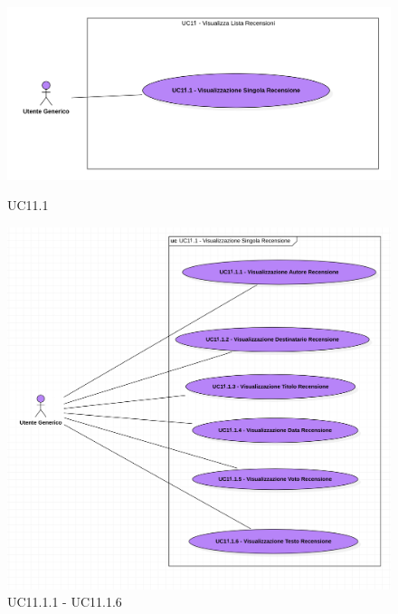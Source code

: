             \begin{figure}[H]
                \centering
                \includegraphics[scale=0.6]{src/img/UC11.1.png}
                \caption{UC11.1}
                \includegraphics[scale=0.4]{src/img/UC11.1.x.png}
                \caption{UC11.1.1 - UC11.1.6}
            \end{figure}

